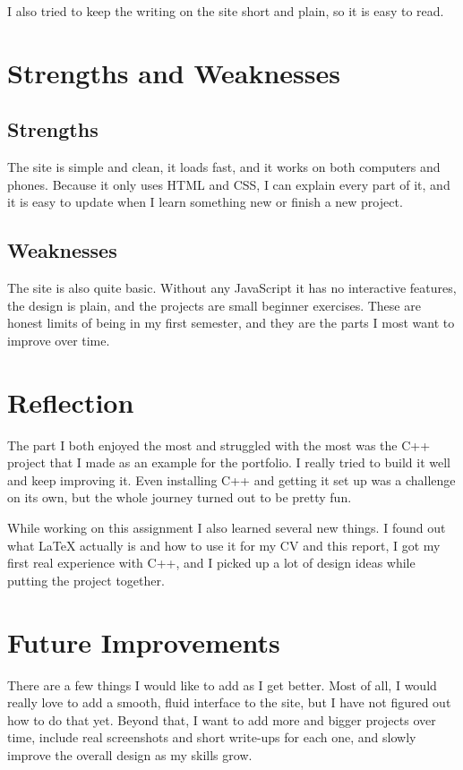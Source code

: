 \documentclass[11pt,a4paper]{article}
\begin{document}
I also tried to keep the writing on the site short and plain, so it is easy to read.

\section{Strengths and Weaknesses}

\subsection{Strengths}
The site is simple and clean, it loads fast, and it works on both computers and phones.
Because it only uses HTML and CSS, I can explain every part of it, and it is easy to update
when I learn something new or finish a new project.

\subsection{Weaknesses}
The site is also quite basic. Without any JavaScript it has no interactive features, the
design is plain, and the projects are small beginner exercises. These are honest limits of
being in my first semester, and they are the parts I most want to improve over time.

\section{Reflection}

The part I both enjoyed the most and struggled with the most was the C++ project that I made
as an example for the portfolio. I really tried to build it well and keep improving it. Even
installing C++ and getting it set up was a challenge on its own, but the whole journey turned
out to be pretty fun.

While working on this assignment I also learned several new things. I found out what LaTeX
actually is and how to use it for my CV and this report, I got my first real experience with
C++, and I picked up a lot of design ideas while putting the project together.

\section{Future Improvements}

There are a few things I would like to add as I get better. Most of all, I would really love
to add a smooth, fluid interface to the site, but I have not figured out how to do that yet.
Beyond that, I want to add more and bigger projects over time, include real screenshots and
short write-ups for each one, and slowly improve the overall design as my skills grow.
\end{document}
